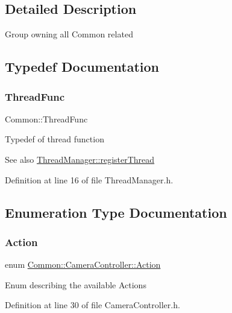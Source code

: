 \subsection{Detailed Description}
Group owning all Common related 

\subsection{Typedef Documentation}
\mbox{\label{group___common_ga30c64a033e17f4a1fd985caa74ccf922}} 
\subsubsection{\texorpdfstring{Thread\+Func}{ThreadFunc}}
{\footnotesize\ttfamily Common\+::\+Thread\+Func}

Typedef of thread function

\begin{DoxySeeAlso}{See also}
\hyperlink{class_common_1_1_thread_manager_a79a947a3ff5c8a34e51cc41007832aeb}{Thread\+Manager\+::register\+Thread} 
\end{DoxySeeAlso}


Definition at line 16 of file Thread\+Manager.\+h.



\subsection{Enumeration Type Documentation}
\mbox{\label{group___common_gaf299b39b39b578b2235220e5fa8dfc01}} 
\subsubsection{\texorpdfstring{Action}{Action}}
{\footnotesize\ttfamily enum \hyperlink{group___common_gaf299b39b39b578b2235220e5fa8dfc01}{Common\+::\+Camera\+Controller\+::\+Action}\hspace{0.3cm}{\ttfamily [protected]}}

Enum describing the available Actions 

Definition at line 30 of file Camera\+Controller.\+h.

\mbox{\label{group___common_gaa8c87d2b450282716c906da283e149e6}} 
